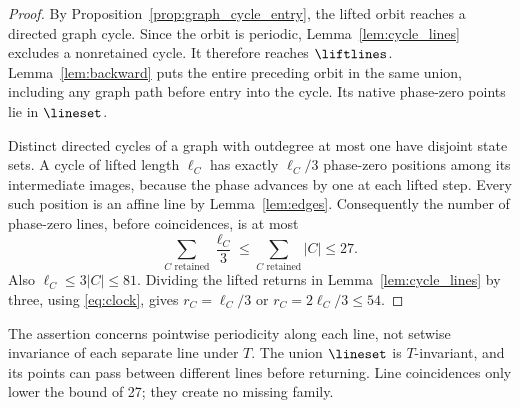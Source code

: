 \begin{proof}
By Proposition~\ref{prop:graph_cycle_entry}, the lifted orbit reaches
a directed graph cycle. Since the orbit is periodic,
Lemma~\ref{lem:cycle_lines} excludes a nonretained cycle. It therefore
reaches \(\liftlines\). Lemma~\ref{lem:backward} puts the entire
preceding orbit in the same union, including any graph path before
entry into the cycle. Its native phase-zero points lie in
\(\lineset\).

Distinct directed cycles of a graph with outdegree at most one have
disjoint state sets. A cycle of lifted length \(\ell_C\) has exactly
\(\ell_C/3\) phase-zero positions among its intermediate images,
because the phase advances by one at each lifted step. Every such
position is an affine line by Lemma~\ref{lem:edges}. Consequently the
number of phase-zero lines, before coincidences, is at most
\[
 \sum_{C\text{ retained}}\frac{\ell_C}{3}
 \le \sum_{C\text{ retained}}|C|\le27.
\]
Also \(\ell_C\le3|C|\le81\). Dividing the lifted returns in
Lemma~\ref{lem:cycle_lines} by three, using \eqref{eq:clock}, gives
\(r_C=\ell_C/3\) or \(r_C=2\ell_C/3\le54\).
\end{proof}

The assertion concerns pointwise periodicity along each line, not
setwise invariance of each separate line under \(T\). The union
\(\lineset\) is \(T\)-invariant, and its points can pass between
different lines before returning. Line coincidences only lower the
bound of 27; they create no missing family.
